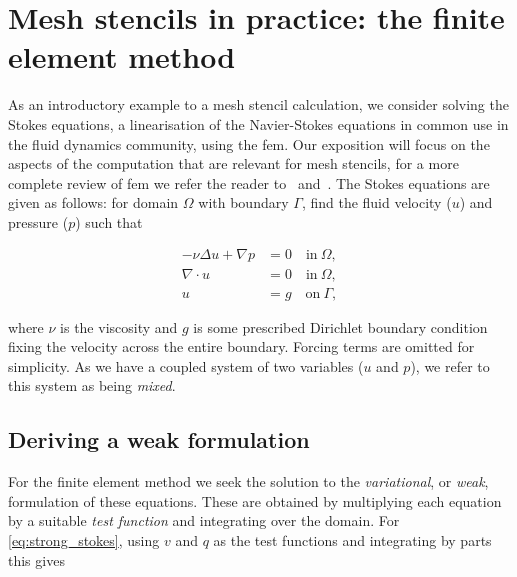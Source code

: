 \documentclass[thesis]{subfiles}
\begin{document}
\section{Mesh stencils in practice: the finite element method}
\label{sec:stokes_equations}

As an introductory example to a mesh stencil calculation, we consider solving the Stokes equations, a linearisation of the Navier-Stokes equations in common use in the fluid dynamics community, using the \gls{fem}.
Our exposition will focus on the aspects of the computation that are relevant for mesh stencils, for a more complete review of \gls{fem} we refer the reader to~\cite{brennerMathematicalTheoryFinite2008} and~\cite{larsonFiniteElementMethod2013}.
The Stokes equations are given as follows: for domain $\Omega$ with boundary $\Gamma$, find the fluid velocity ($u$) and pressure ($p$) such that

\begin{subequations}
  \begin{align}
    - \nu \Delta u + \nabla p &= 0 \quad \textrm{in} \ \Omega, \\
    \nabla \cdot u &= 0 \quad \textrm{in} \ \Omega, \\
    u &= g \quad \textrm{on} \ \Gamma,
  \end{align}
  \label{eq:strong_stokes}
\end{subequations}


where $\nu$ is the viscosity and $g$ is some prescribed Dirichlet boundary condition fixing the velocity across the entire boundary.
Forcing terms are omitted for simplicity.
As we have a coupled system of two variables ($u$ and $p$), we refer to this system as being \textit{mixed}.

\subsection{Deriving a weak formulation}


For the finite element method we seek the solution to the \textit{variational}, or \textit{weak}, formulation of these equations.
These are obtained by multiplying each equation by a suitable \textit{test function} and integrating over the domain.
For \cref{eq:strong_stokes}, using $v$ and $q$ as the test functions and integrating by parts this gives
\end{document}
